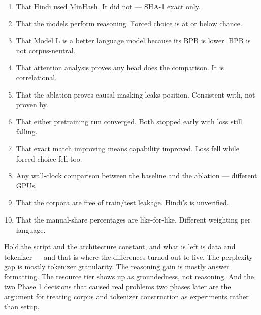 \documentclass[11pt]{report}
\begin{document}
\begin{enumerate}
\item That Hindi used MinHash. It did not --- SHA-1 exact only.
\item That the models perform reasoning. Forced choice is at or below chance.
\item That Model L is a better language model because its BPB is lower. BPB is
not corpus-neutral.
\item That attention analysis proves any head does the comparison. It is
correlational.
\item That the ablation proves causal masking leaks position. Consistent with,
not proven by.
\item That either pretraining run converged. Both stopped early with loss still
falling.
\item That exact match improving means capability improved. Loss fell while
forced choice fell too.
\item Any wall-clock comparison between the baseline and the ablation ---
different GPUs.
\item That the corpora are free of train/test leakage. Hindi's is unverified.
\item That the manual-share percentages are like-for-like. Different weighting
per language.
\end{enumerate}

\begin{tcolorbox}[colback=conceptgreen!7,colframe=conceptgreen,
  title={\textbf{Final conclusion}}]
Hold the script and the architecture constant, and what is left is data and
tokenizer --- and that is where the differences turned out to live. The
perplexity gap is mostly tokenizer granularity. The reasoning gain is mostly
answer formatting. The resource tier shows up as groundedness, not reasoning.
And the two Phase 1 decisions that caused real problems two phases later are the
argument for treating corpus and tokenizer construction as experiments rather
than setup.
\end{tcolorbox}
\end{document}
